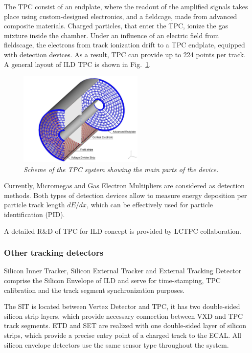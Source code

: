 The TPC consist of an endplate, where the readout of the amplified signals takes place using custom-designed electronics, and a fieldcage, made from advanced composite materials. 
Charged particles, that enter the TPC, ionize the gas mixture inside the chamber. Under an influence of an electric field from fieldscage, the electrons from track ionization drift to a TPC endplate, equipped with detection devices. As a result, TPC can provide up to 224 points per track.
A general layout of ILD TPC is shown in Fig.~\ref{fig:ILCtpc}. 
\begin{figure}
{\centering
    \includegraphics[width=0.55\textwidth]{graphics/ILCtpc.jpg}
    \caption{\sl Scheme of the TPC system showing the main parts of the device.}
    \label{fig:ILCtpc}
  }
\end{figure}

Currently, Micromegas and Gas Electron Multipliers are considered as detection methods. Both types of detection devices allow to measure energy deposition per particle track length $dE/dx$, which can be effectively used for particle identification (PID).

A detailed R\&D of TPC for ILD concept is provided by LCTPC collaboration.

\subsubsection{Other tracking detectors}
Silicon Inner Tracker, Silicon External Tracker and External Tracking Detector comprise the Silicon Envelope of ILD and serve for time-stamping, TPC calibration and the track segment synchronization purposes. 


The SIT is located between Vertex Detector and TPC, it has two double-sided silicon strip layers, which provide necessary connection between VXD and TPC track segments. ETD and SET are realized with one double-sided layer of silicon strips, which provide a precise entry point of a charged track to the ECAL. All silicon envelope detectors use the same sensor type throughout the system.

